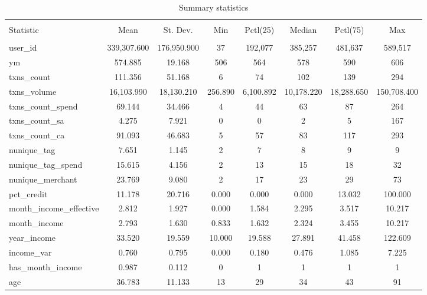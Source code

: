
\begin{table}[!htbp] \centering 
  \caption{Summary statistics} 
  \label{tab:sumstats} 
\scriptsize 
\begin{tabular}{@{\extracolsep{5pt}}lccccccc} 
\\[-1.8ex]\hline 
\hline \\[-1.8ex] 
Statistic & \multicolumn{1}{c}{Mean} & \multicolumn{1}{c}{St. Dev.} & \multicolumn{1}{c}{Min} & \multicolumn{1}{c}{Pctl(25)} & \multicolumn{1}{c}{Median} & \multicolumn{1}{c}{Pctl(75)} & \multicolumn{1}{c}{Max} \\ 
\hline \\[-1.8ex] 
user\_id & 339,307.600 & 176,950.900 & 37 & 192,077 & 385,257 & 481,637 & 589,517 \\ 
ym & 574.885 & 19.168 & 506 & 564 & 578 & 590 & 606 \\ 
txns\_count & 111.356 & 51.168 & 6 & 74 & 102 & 139 & 294 \\ 
txns\_volume & 16,103.990 & 18,130.210 & 256.890 & 6,100.892 & 10,178.220 & 18,288.650 & 150,708.400 \\ 
txns\_count\_spend & 69.144 & 34.466 & 4 & 44 & 63 & 87 & 264 \\ 
txns\_count\_sa & 4.275 & 7.921 & 0 & 0 & 2 & 5 & 167 \\ 
txns\_count\_ca & 91.093 & 46.683 & 5 & 57 & 83 & 117 & 293 \\ 
nunique\_tag & 7.651 & 1.145 & 2 & 7 & 8 & 9 & 9 \\ 
nunique\_tag\_spend & 15.615 & 4.156 & 2 & 13 & 15 & 18 & 32 \\ 
nunique\_merchant & 23.769 & 9.080 & 2 & 17 & 23 & 29 & 73 \\ 
pct\_credit & 11.178 & 20.716 & 0.000 & 0.000 & 0.000 & 13.032 & 100.000 \\ 
month\_income\_effective & 2.812 & 1.927 & 0.000 & 1.584 & 2.295 & 3.517 & 10.217 \\ 
month\_income & 2.793 & 1.630 & 0.833 & 1.632 & 2.324 & 3.455 & 10.217 \\ 
year\_income & 33.520 & 19.559 & 10.000 & 19.588 & 27.891 & 41.458 & 122.609 \\ 
income\_var & 0.760 & 0.795 & 0.000 & 0.180 & 0.476 & 1.085 & 7.225 \\ 
has\_month\_income & 0.987 & 0.112 & 0 & 1 & 1 & 1 & 1 \\ 
age & 36.783 & 11.133 & 13 & 29 & 34 & 43 & 91 \\ 

\end{tabular}
\end{table}
